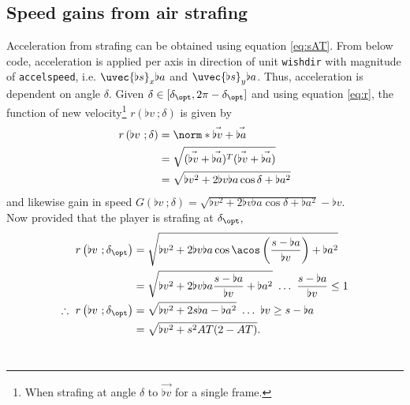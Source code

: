 \subsection{Speed gains from air strafing}
\label{sec:accel_air}
Acceleration from strafing can be obtained using equation \eqref{eq:sAT}.
From below code, acceleration is applied per axis in direction of unit \texttt{wishdir} with magnitude of \texttt{accelspeed}, i.e. $\uvec{\flat{s}}_x\flat{a}$ and $\uvec{\flat{s}}_y\flat{a}$.
Thus, acceleration is dependent on angle $\delta$.
Given $\delta \in [\delta_{\opt}, 2\pi - \delta_{\opt}]$ and using equation \eqref{eq:r}, the function of new velocity\footnote{When strafing at angle $\delta$ to $\vec{\flat{v}}$ for a single frame.} $r\left(\flat{v}\ ;\delta \right)$ is given by
\begin{align*}
r\left(\flat{v}\ ;\delta \right) &= \norm*{\vec{\flat{v}} + \vec{\flat{a}}}\\
&= \sqrt{(\vec{\flat{v}} + \vec{\flat{a}})^T (\vec{\flat{v}} + \vec{\flat{a}})}\\
&= \sqrt{\flat{v}^2 + 2\flat{v}\flat{a}\cos\delta + \flat{a}^2}
\end{align*}
and likewise gain in speed $G\left(\flat{v}\ ;\delta \right) = \sqrt{\flat{v}^2 + 2\flat{v}\flat{a}\cos\delta + \flat{a}^2} - \flat{v}$.\\

Now provided that the player is strafing at $\delta_{\opt}$,
\begin{align}
\nonumber
r\left(\flat{v}\ ;\delta_{\opt} \right) &= \sqrt{\flat{v}^2 + 2\flat{v}\flat{a}\cos{\acos\left( \frac{s - \flat{a}}{\flat{v}} \right)} + \flat{a}^2}\\\nonumber
&= \sqrt{\flat{v}^2 + 2\flat{v}\flat{a}\frac{s - \flat{a}}{\flat{v}} + \flat{a}^2}\ \ldots\ \frac{s - \flat{a}}{\flat{v}}\le 1\\
\label{eq:accel_opt_air}
\therefore\ r\left(\flat{v}\ ;\delta_{\opt} \right) &= \sqrt{\flat{v}^2 + 2s\flat{a} - \flat{a}^2}\ \ldots\ \flat{v}\ge s - \flat{a}\\\nonumber
&= \sqrt{\flat{v}^2 + s^2 AT(2 - AT)}.
\end{align}\\

